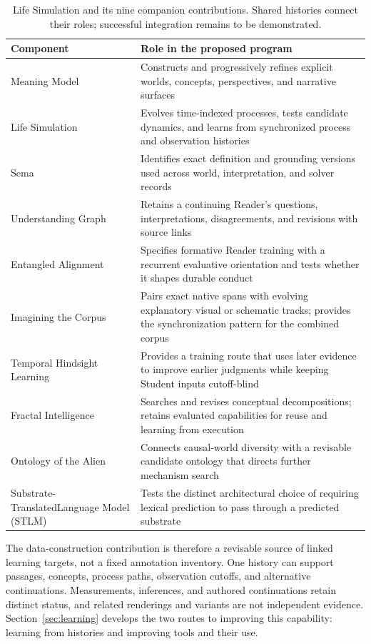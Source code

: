 \documentclass[10pt]{article}
\begin{document}
\begin{table}[!htbp]
\centering
\small
\begin{tabularx}{\textwidth}{@{}p{}Y@{}}
\toprule
Component & Role in the proposed program \\
\midrule
Meaning Model & Constructs and progressively refines explicit worlds, concepts, perspectives, and narrative surfaces \\
Life Simulation & Evolves time-indexed processes, tests candidate dynamics, and learns from synchronized process and observation histories \\
Sema & Identifies exact definition and grounding versions used across world, interpretation, and solver records \\
Understanding Graph & Retains a continuing Reader's questions, interpretations, disagreements, and revisions with source links \\
Entangled Alignment & Specifies formative Reader training with a recurrent evaluative orientation and tests whether it shapes durable conduct \\
Imagining the Corpus & Pairs exact native spans with evolving explanatory visual or schematic tracks; provides the synchronization pattern for the combined corpus \\
Temporal Hindsight Learning & Provides a training route that uses later evidence to improve earlier judgments while keeping Student inputs cutoff-blind \\
Fractal Intelligence & Searches and revises conceptual decompositions; retains evaluated capabilities for reuse and learning from execution \\
Ontology of the Alien & Connects causal-world diversity with a revisable candidate ontology that directs further mechanism search \\
Substrate-Translated\newline Language Model (STLM) & Tests the distinct architectural choice of requiring lexical prediction to pass through a predicted substrate \\
\bottomrule
\end{tabularx}
\caption{Life Simulation and its nine companion contributions. Shared histories
connect their roles; successful integration remains to be demonstrated.}
\label{tab:program-roles}
\end{table}

The data-construction contribution is therefore a revisable source of linked
learning targets, not a fixed annotation inventory. One history can support
passages, concepts, process paths, observation cutoffs, and alternative
continuations. Measurements, inferences, and authored continuations
retain distinct status, and related renderings and variants are not
independent evidence. Section~\ref{sec:learning} develops the two routes to
improving this capability: learning from histories and improving tools and
their use.
\end{document}
